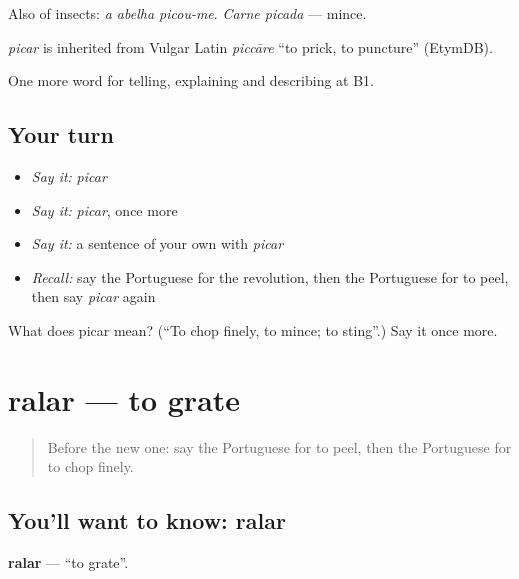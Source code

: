 Also of insects: \emph{a abelha picou-me}. \emph{Carne picada} — mince.

\begin{cousinweb}
\emph{picar} is inherited from Vulgar Latin \emph{piccāre} \textquotedblleft{}to prick, to puncture\textquotedblright{} (EtymDB).
\end{cousinweb}

\begin{grammarlens}[title={What you've built}]
One more word for telling, explaining and describing at B1.
\end{grammarlens}

\subsection*{Your turn}
\begin{itemize}
\raggedright
  \item \emph{Say it:} \emph{picar}
  \item \emph{Say it:} \emph{picar}, once more
  \item \emph{Say it:} a sentence of your own with \emph{picar}
  \item \emph{Recall:} say the Portuguese for the revolution, then the Portuguese for to peel, then say \emph{picar} again
\end{itemize}

\begin{tcolorbox}[breakable,colback=teal!4,colframe=teal!35!black,title={Before you move on}]
What does picar mean? (\textquotedblleft{}To chop finely, to mince; to sting\textquotedblright{}.) Say it once more.
\end{tcolorbox}
\section[ralar]{ralar — to grate}

\label{lesson:PT-C330-ralar}



\begin{quote}
Before the new one: say the Portuguese for to peel, then the Portuguese for to chop finely.
\end{quote}

\subsection*{You'll want to know: ralar}
\textbf{ralar} — \textquotedblleft{}to grate\textquotedblright{}.

